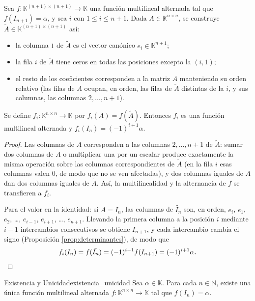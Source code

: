 \documentclass[11pt, a4paper]{article}
\begin{document}
\begin{lema}\label{lem:insercion}
Sea $f: \mathbb{K}^{(n+1) \times (n+1)} \to \mathbb{K}$ una función multilineal alternada tal que $f(I_{n+1}) = \alpha$, y sea $i$ con $1 \le i \le n+1$. Dada $A \in \mathbb{K}^{n \times n}$, se construye $\tilde{A} \in \mathbb{K}^{(n+1) \times (n+1)}$ así:
\begin{itemize}
    \item la columna $1$ de $\tilde{A}$ es el vector canónico $e_i \in \mathbb{K}^{n+1}$;
    \item la fila $i$ de $\tilde{A}$ tiene ceros en todas las posiciones excepto la $(i,1)$;
    \item el resto de los coeficientes corresponden a la matriz $A$ manteniendo su orden relativo (las filas de $A$ ocupan, en orden, las filas de $\tilde{A}$ distintas de la $i$, y sus columnas, las columnas $2, \dots, n+1$).
\end{itemize}
Se define $f_i: \mathbb{K}^{n \times n} \to \mathbb{K}$ por $f_i(A) = f(\tilde{A})$.
Entonces $f_i$ es una función multilineal alternada y $f_i(I_n) = (-1)^{i+1} \alpha$.
\end{lema}

\begin{proof}
Las columnas de $A$ corresponden a las columnas $2, \dots, n+1$ de $\tilde{A}$: sumar dos columnas de $A$ o multiplicar una por un escalar produce exactamente la misma operación sobre las columnas correspondientes de $\tilde{A}$ (en la fila $i$ esas columnas valen $0$, de modo que no se ven afectadas), y dos columnas iguales de $A$ dan dos columnas iguales de $\tilde{A}$. Así, la multilinealidad y la alternancia de $f$ se transfieren a $f_i$.

Para el valor en la identidad: si $A = I_n$, las columnas de $\tilde{I_n}$ son, en orden, $e_i$, $e_1$, $e_2$, \dots, $e_{i-1}$, $e_{i+1}$, \dots, $e_{n+1}$. Llevando la primera columna a la posición $i$ mediante $i-1$ intercambios consecutivos se obtiene $I_{n+1}$, y cada intercambio cambia el signo (Proposición \ref{prop:determinantes}), de modo que
\[
f_i(I_n) = f(\tilde{I_n}) = (-1)^{i-1} f(I_{n+1}) = (-1)^{i+1} \alpha. \qedhere
\]
\end{proof}

\begin{teorema}{Existencia y Unicidad}{existencia_unicidad}
Sea $\alpha \in \mathbb{K}$. Para cada $n \in \mathbb{N}$, existe una única función multilineal alternada $f: \mathbb{K}^{n \times n} \to \mathbb{K}$ tal que $f(I_n) = \alpha$.
\end{teorema}
\end{document}

